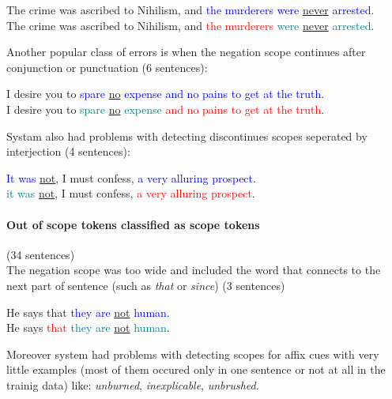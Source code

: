 \documentclass{article}
\begin{document}
\begin{displayquote}
The crime was ascribed to Nihilism, and \textcolor{blue}{the murderers were} \underline{never} \textcolor{blue}{arrested}.\\
The crime was ascribed to Nihilism, and \textcolor{red}{the murderers} \textcolor{teal}{were} \underline{never} \textcolor{teal}{arrested}.
\end{displayquote}
Another popular class of errors is when the negation scope continues after conjunction or punctuation (6 sentences):
\begin{displayquote}
I desire you to \textcolor{blue}{spare} \underline{no} \textcolor{blue}{expense and no pains to get at the truth}.\\
I desire you to \textcolor{teal}{spare} \underline{no} \textcolor{teal}{expense} \textcolor{red}{and no pains to get at the truth}.
\end{displayquote}
Systam also had problems with detecting discontinues scopes seperated by interjection (4 sentences):

\begin{displayquote}
\textcolor{blue}{It was} \underline{not}, I must confess, \textcolor{blue}{a very alluring prospect}. \\
\textcolor{teal}{it was} \underline{not}, I must confess, \textcolor{red}{a very alluring prospect}.

\end{displayquote}
    
\paragraph {Out of scope tokens classified as scope tokens} (34 sentences)\\
The negation scope was too wide
and included the word that connects to the next part of sentence (such as \textit{that} or \textit{since})
(3 sentences)
\begin{displayquote}
He says that \textcolor{blue}{they are} \underline{not} \textcolor{blue}{human}.\\
He says \textcolor{red}{that} \textcolor{teal}{they are} \underline{not} \textcolor{teal}{human}.
\end{displayquote}

Moreover system had problems with detecting scopes for affix cues with very little examples (most of them occured
only in one sentence or not at all in the trainig data) like: \textit{unburned}, \textit{inexplicable}, \textit{unbrushed}.
\newpage
\end{document}

